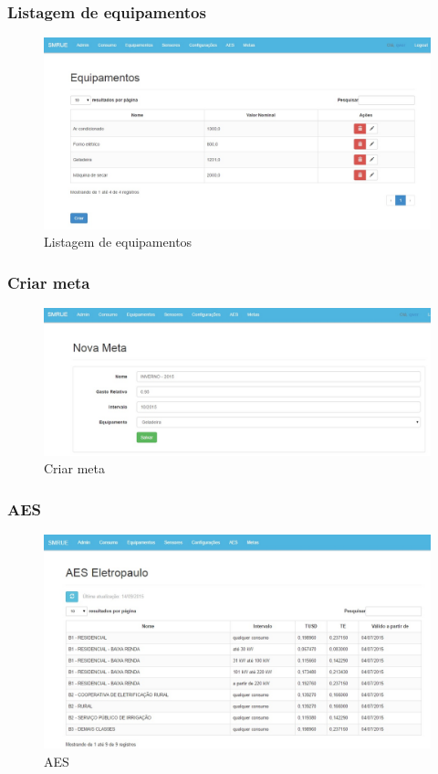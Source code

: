 \subsubsection{Listagem de equipamentos}
\begin{figure}[H]
\centering
\includegraphics[width=1\textwidth]{figuras/equipamentos_list.jpg}
\caption{\label{fig:telas-equipamentos-list} Listagem de equipamentos}
\end{figure}

\subsubsection{Criar meta}
\begin{figure}[H]
\centering
\includegraphics[width=1\textwidth]{figuras/meta.jpg}
\caption{\label{fig:telas-metas-create} Criar meta}
\end{figure}

\subsubsection{AES}
\begin{figure}[H]
\centering
\includegraphics[width=1\textwidth]{figuras/aes.jpg}
\caption{\label{fig:telas-aes} AES}
\end{figure}

